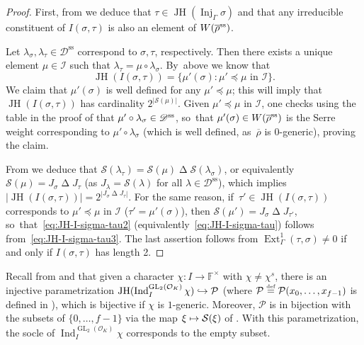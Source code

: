 \documentclass[JEP,XML,SOM,Unicode,NoFloatCountersInSection, NoEqCountersInSection,published]{cedram}
\newcommand\mto{\mathchoice{\longmapsto}{\mapsto}{\mapsto}{\mapsto}}
\newcommand\hto{\mathrel{\lhook\joinrel\to}}
\newcommand{\defeq}{\stackrel{\textrm{\tiny{\upshape{def}}}}{=}}
\newcommand{\F}{\mathbb{F}}
\newcommand{\cI}{\mathcal{I}}
\newcommand{\cO}{\mathcal{O}}
\newcommand{\cS}{\mathcal{S}}
\newcommand{\D}{\mathscr D}
\renewcommand{\ss}{\mathrm{ss}}
\newcommand{\brho}{\overline{\rho}}
\DeclareMathOperator{\Ext}{Ext}
\DeclareMathOperator{\GL}{GL}
\DeclareMathOperator{\Ind}{Ind}
\DeclareMathOperator{\Inj}{Inj}
\DeclareMathOperator{\JH}{\mathrm{JH}}
\theoremstyle{plain}
\theoremstyle{definition}
\begin{document}
\begin{proof}
First, from \cite[Prop.\,2.24]{HuWang} we deduce that $\tau\in \JH(\Inj_{\Gamma}\sigma)$ and that any irreducible constituent of $I(\sigma,\tau)$ is also an element of $W(\brho^{\rm ss})$.

Let $\lambda_{\sigma}, \lambda_{\tau}\in \D^\ss$ correspond to $\sigma,\tau$, respectively. Then there exists a unique element $\mu\in \mathcal{I}$ such that $\lambda_{\tau}=\mu\circ \lambda_{\sigma}$. By~above we know that
\begin{equation}\label{eq:JH-I-sigma-tau3}
\JH(I(\sigma,\tau)) = \{ \mu'(\sigma): \mu' \preceq \mu \text{ in }\cI \}.
\end{equation}
We claim that $\mu'(\sigma)$ is well defined for any $\mu'\preceq \mu$; this will imply that $\JH(I(\sigma,\tau))$ has cardinality $2^{|\cS(\mu)|}$. Given $\mu'\preceq \mu$ in $\cI$, one checks using the table in the proof of \cite[Lem.\,2.6]{HuWang2} that $\mu'\circ\lambda_{\sigma}\in \D^{\rm ss}$, so~that $\mu'(\sigma)\in W(\brho^{\rm ss})$ is the Serre weight corresponding to $\mu'\circ\lambda_{\sigma}$ (which is well defined, as~$\brho$ is $0$-generic), proving the claim.

From \cite[Lem.\,2.6(i)]{HuWang2} we deduce that $\cS(\lambda_\tau) = \cS(\mu) \mathbin\Delta \cS(\lambda_\sigma)$, or equivalently $\cS(\mu) = J_\sigma \mathbin\Delta J_\tau$ (as $J_{\lambda} = \cS(\lambda)$ for all $\lambda \in \D^\ss$), which implies $|\JH(I(\sigma,\tau))|=2^{|J_{\sigma}\mathbin\Delta J_{\tau}|}$.
For the same reason, if~$\tau'\in \JH(I(\sigma,\tau))$ corresponds to $\mu'\preceq\mu$ in $\cI$ (\ie $\tau'=\mu'(\sigma)$), then $ \cS(\mu') = J_\sigma\mathbin\Delta J_{\tau'}$, so~that~\eqref{eq:JH-I-sigma-tau2} (equivalently~\eqref{eq:JH-I-sigma-tau}) follows from~\eqref{eq:JH-I-sigma-tau3}.
The last assertion follows from $\Ext^1_\Gamma(\tau,\sigma) \ne 0$ if and only if $I(\sigma,\tau)$ has length 2.
\end{proof}

Recall from \cite[\S 3.1]{BHHMS4} and \cite[Rem.\,3.1.1]{BHHMS4} that given a character $\chi:I\to\F^{\times}$ {with $\chi\ne\chi^s$}, there is an injective parametrization \hbox{$\JH(\Ind_I^{\GL_2(\cO_K)}\chi) \hto \mathcal{P}$} (where $\mathcal P \defeq \mathcal{P}(x_0,\dots,x_{f-1})$ is defined in \cite[\S 2]{BP}), which is bijective if $\chi$ is $1$\nobreakdash-generic.
Moreover, $\mathcal{P}$ is in bijection with the subsets of $\{0,\dots,f-1\}$ via the map $\xi \mto \mathcal{S}(\xi)$ of \cite[Eq.\,(36)]{BHHMS4}.
With this parametrization, the socle of $\Ind_I^{\GL_2(\cO_K)}\chi$ corresponds to the empty subset.
\end{document}

